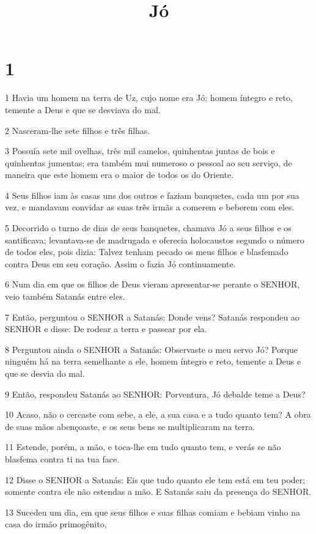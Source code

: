 

\title{Jó}


\chapter{1}

\par 1 Havia um homem na terra de Uz, cujo nome era Jó; homem íntegro e reto, temente a Deus e que se desviava do mal.
\par 2 Nasceram-lhe sete filhos e três filhas.
\par 3 Possuía sete mil ovelhas, três mil camelos, quinhentas juntas de bois e quinhentas jumentas; era também mui numeroso o pessoal ao seu serviço, de maneira que este homem era o maior de todos os do Oriente.
\par 4 Seus filhos iam às casas uns dos outros e faziam banquetes, cada um por sua vez, e mandavam convidar as suas três irmãs a comerem e beberem com eles.
\par 5 Decorrido o turno de dias de seus banquetes, chamava Jó a seus filhos e os santificava; levantava-se de madrugada e oferecia holocaustos segundo o número de todos eles, pois dizia: Talvez tenham pecado os meus filhos e blasfemado contra Deus em seu coração. Assim o fazia Jó continuamente.
\par 6 Num dia em que os filhos de Deus vieram apresentar-se perante o SENHOR, veio também Satanás entre eles.
\par 7 Então, perguntou o SENHOR a Satanás: Donde vens? Satanás respondeu ao SENHOR e disse: De rodear a terra e passear por ela.
\par 8 Perguntou ainda o SENHOR a Satanás: Observaste o meu servo Jó? Porque ninguém há na terra semelhante a ele, homem íntegro e reto, temente a Deus e que se desvia do mal.
\par 9 Então, respondeu Satanás ao SENHOR: Porventura, Jó debalde teme a Deus?
\par 10 Acaso, não o cercaste com sebe, a ele, a sua casa e a tudo quanto tem? A obra de suas mãos abençoaste, e os seus bens se multiplicaram na terra.
\par 11 Estende, porém, a mão, e toca-lhe em tudo quanto tem, e verás se não blasfema contra ti na tua face.
\par 12 Disse o SENHOR a Satanás: Eis que tudo quanto ele tem está em teu poder; somente contra ele não estendas a mão. E Satanás saiu da presença do SENHOR.
\par 13 Sucedeu um dia, em que seus filhos e suas filhas comiam e bebiam vinho na casa do irmão primogênito,
